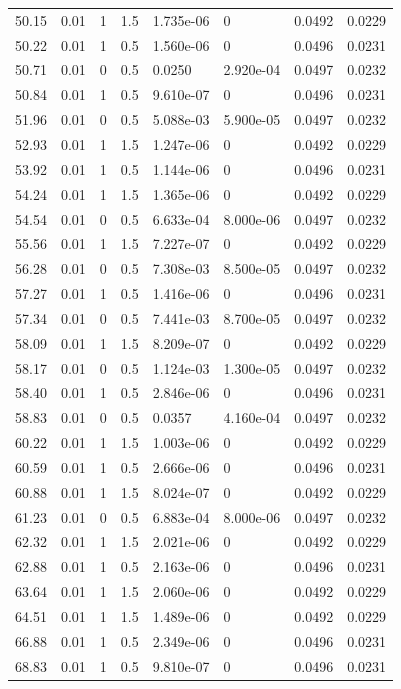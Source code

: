\documentclass[preview]{standalone}
\begin{document}
{{\begin{tabular}{L{1.2cm}C{1.2cm} C{0.3cm}C{0.5cm} C{1.4cm}C{1.4cm} C{1.4cm}C{1.4cm}}
  50.15  &  0.01  & 1     & 1.5 &  1.735e-06  & 0  & 0.0492 &  0.0229   \\ 
  50.22  &  0.01  & 1     & 0.5 &  1.560e-06  & 0  & 0.0496 &  0.0231   \\ 
  50.71  &  0.01  & 0     & 0.5 &  0.0250  & 2.920e-04  & 0.0497 &  0.0232   \\ 
  50.84  &  0.01  & 1     & 0.5 &  9.610e-07  & 0  & 0.0496 &  0.0231   \\ 
  51.96  &  0.01  & 0     & 0.5 &  5.088e-03  & 5.900e-05  & 0.0497 &  0.0232   \\ 
  52.93  &  0.01  & 1     & 1.5 &  1.247e-06  & 0  & 0.0492 &  0.0229   \\ 
  53.92  &  0.01  & 1     & 0.5 &  1.144e-06  & 0  & 0.0496 &  0.0231   \\ 
  54.24  &  0.01  & 1     & 1.5 &  1.365e-06  & 0  & 0.0492 &  0.0229   \\ 
  54.54  &  0.01  & 0     & 0.5 &  6.633e-04  & 8.000e-06  & 0.0497 &  0.0232   \\ 
  55.56  &  0.01  & 1     & 1.5 &  7.227e-07  & 0  & 0.0492 &  0.0229   \\ 
  56.28  &  0.01  & 0     & 0.5 &  7.308e-03  & 8.500e-05  & 0.0497 &  0.0232   \\ 
  57.27  &  0.01  & 1     & 0.5 &  1.416e-06  & 0  & 0.0496 &  0.0231   \\ 
  57.34  &  0.01  & 0     & 0.5 &  7.441e-03  & 8.700e-05  & 0.0497 &  0.0232   \\ 
  58.09  &  0.01  & 1     & 1.5 &  8.209e-07  & 0  & 0.0492 &  0.0229   \\ 
  58.17  &  0.01  & 0     & 0.5 &  1.124e-03  & 1.300e-05  & 0.0497 &  0.0232   \\ 
  58.40  &  0.01  & 1     & 0.5 &  2.846e-06  & 0  & 0.0496 &  0.0231   \\ 
  58.83  &  0.01  & 0     & 0.5 &  0.0357  & 4.160e-04  & 0.0497 &  0.0232   \\ 
  60.22  &  0.01  & 1     & 1.5 &  1.003e-06  & 0  & 0.0492 &  0.0229   \\ 
  60.59  &  0.01  & 1     & 0.5 &  2.666e-06  & 0  & 0.0496 &  0.0231   \\ 
  60.88  &  0.01  & 1     & 1.5 &  8.024e-07  & 0  & 0.0492 &  0.0229   \\ 
  61.23  &  0.01  & 0     & 0.5 &  6.883e-04  & 8.000e-06  & 0.0497 &  0.0232   \\ 
  62.32  &  0.01  & 1     & 1.5 &  2.021e-06  & 0  & 0.0492 &  0.0229   \\ 
  62.88  &  0.01  & 1     & 0.5 &  2.163e-06  & 0  & 0.0496 &  0.0231   \\ 
  63.64  &  0.01  & 1     & 1.5 &  2.060e-06  & 0  & 0.0492 &  0.0229   \\ 
  64.51  &  0.01  & 1     & 1.5 &  1.489e-06  & 0  & 0.0492 &  0.0229   \\ 
  66.88  &  0.01  & 1     & 0.5 &  2.349e-06  & 0  & 0.0496 &  0.0231   \\ 
  68.83  &  0.01  & 1     & 0.5 &  9.810e-07  & 0  & 0.0496 &  0.0231   \\ 
\hline 
\end{tabular} 

}}
\end{document}
